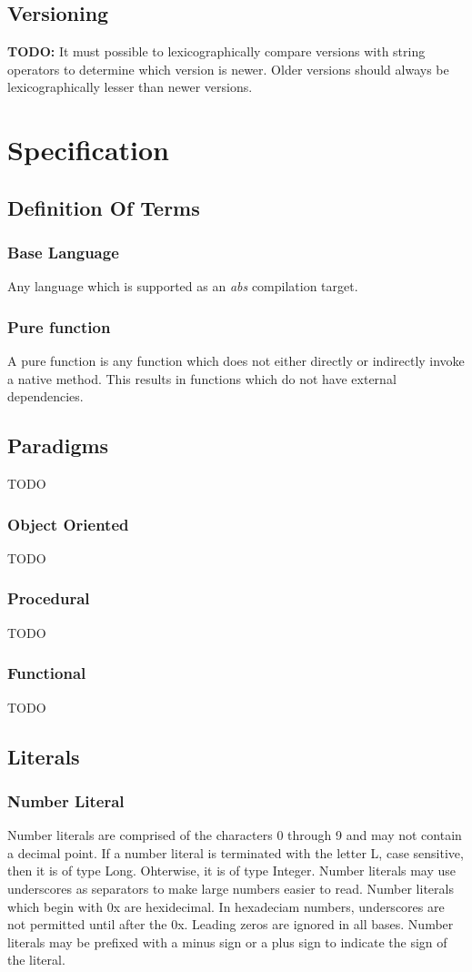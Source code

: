 \documentclass[hidelinks]{article}
\begin{document}
\subsection{Versioning}
\textbf{TODO: }It must possible to lexicographically compare versions with string operators to determine which version is newer. Older versions should always be lexicographically lesser than newer versions.
\newpage
\section{Specification}
\subsection{Definition Of Terms}
\subsubsection{Base Language}
Any language which is supported as an \textit{abs} compilation target.
\subsubsection{Pure function}
A pure function is any function which does not either directly or indirectly invoke a native method. This results in functions which do not have external dependencies.
\subsection{Paradigms}

TODO
\subsubsection{Object Oriented}
TODO
\subsubsection{Procedural}
TODO
\subsubsection{Functional}
TODO
\subsection{Literals}
\subsubsection{Number Literal}
Number literals are comprised of the characters 0 through 9 and may not contain a decimal point. If a number literal is terminated with the letter L, case sensitive, then it is of type Long. Ohterwise, it is of type Integer. Number literals may use underscores as separators to make large numbers easier to read. Number literals which begin with 0x are hexidecimal. In hexadeciam numbers, underscores are not permitted until after the 0x. Leading zeros are ignored in all bases. Number literals may be prefixed with a minus sign or a plus sign to indicate the sign of the literal.
\end{document}
